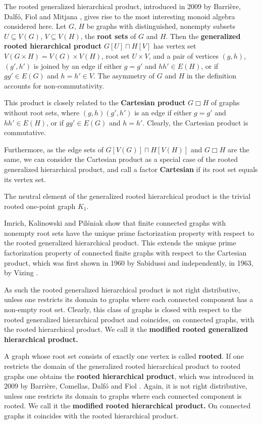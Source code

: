 \documentclass{amsart}
\theoremstyle{plain}
\theoremstyle{definition}
\newcommand{\defit}[1]{\textbf{#1}}
\begin{document}
The rooted generalized hierarchical product, introduced in 2009 by  Barri{\`e}re,  Dalf{\'o}, Fiol and Mitjana \cite{bado2009},  gives rise to the most interesting monoid algebra considered here. Let $G$, $H$ be graphs with distinguished, nonempty subsets $U\subseteq V(G)$, $V\subseteq V(H)$,  the \defit{root sets} of $G$ and $H$. Then the \defit{generalized rooted hierarchical product} $G[U]\sqcap H[V]$ has vertex set $V(G\times H)=V(G) \times V(H)$, root set $U\times V$, and a pair of vertices $(g,h)$, $(g',h')$ is joined by an edge if either $g=g'$ and $hh' \in E(H)$, or if $gg' \in E(G)$ and $h=h' \in V$.
The asymmetry of $G$ and $H$ in the definition
accounts for non-commutativity.

This product is closely related to the \defit{Cartesian product} $G\Box H$ of graphs without root sets, where $(g,h)(g',h')$ is an edge if either $g=g'$ and $hh' \in E(H)$, or if $gg' \in E(G)$ and $h=h'$. Clearly, the Cartesian product is commutative.

Furthermore, as the edge sets of $G[V(G)]\sqcap H[V(H)]$ and $G\Box H$ are the same, we can consider the Cartesian product as a special case of the rooted generalized hierarchical product, and call a factor \defit{Cartesian} if its root set equals its vertex set.

The neutral element of the generalized rooted hierarchical product is the trivial rooted one-point graph $K_1$.

Imrich, Kalinowski and Pil\'{s}niak \cite[Theorem 5]{imrich-kalinowski-pilsniak23} show that finite connected graphs with nonempty root sets have the unique prime factorization property with respect to the rooted generalized  hierarchical product.
This extends the unique prime factorization property of connected finite graphs with respect to the Cartesian product, which  was first shown in 1960 by Sabidussi \cite{sabi1960} and independently, in 1963,  by Vizing \cite{vi1963}.

As such the rooted generalized hierarchical product is not right distributive, unless one restricts its domain to graphs where each connected component has a non-empty root set. Clearly, this class of graphs is closed with respect to the rooted generalized hierarchical product and coincides,  on connected graphs, with the rooted hierarchical product. We call it  the \defit{modified rooted generalized hierarchical product.}

A graph whose root set consists of exactly one vertex is called \defit{rooted}. If one restricts the domain of the generalized rooted hierarchical product to rooted graphs one obtains the \defit{rooted hierarchical product}, which was introduced in 2009 by Barri{\`e}re,  Comellas,  Dalf{\'o} and  Fiol \cite{baco2009}. Again, it is not right distributive,  unless  one restricts its domain  to graphs where each connected component is rooted. We call it the  \defit{modified rooted hierarchical product.} On connected graphs  it coincides with the rooted hierarchical product.
\end{document}
